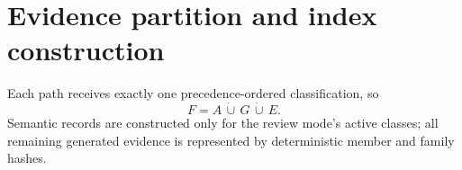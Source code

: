 \documentclass{article}
\begin{document}
\section*{Evidence partition and index construction}
Each path receives exactly one precedence-ordered classification, so
\begin{equation}
F=A\,\dot\cup\,G\,\dot\cup\,E.
\label{deriv:init-evidence-partition}
\end{equation}
Semantic records are constructed only for the review mode's active classes; all remaining generated evidence is represented by deterministic member and family hashes.
\end{document}
